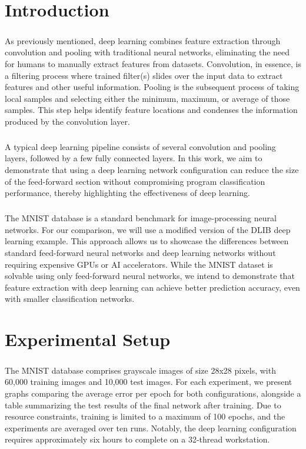 \chapter{Introduction}
\paragraph{}As previously mentioned, deep learning combines feature extraction through convolution and pooling with traditional neural networks, eliminating the need for humans to manually extract features from datasets. Convolution, in essence, is a filtering process where trained filter(s) slides over the input data to extract features and other useful information. Pooling is the subsequent process of taking local samples and selecting either the minimum, maximum, or average of those samples. This step helps identify feature locations and condenses the information produced by the convolution layer.

\paragraph{}A typical deep learning pipeline consists of several convolution and pooling layers, followed by a few fully connected layers. In this work, we aim to demonstrate that using a deep learning network configuration can reduce the size of the feed-forward section without compromising program classification performance, thereby highlighting the effectiveness of deep learning.

\paragraph{}The MNIST database is a standard benchmark for image-processing neural networks. For our comparison, we will use a modified version of the DLIB deep learning example. This approach allows us to showcase the differences between standard feed-forward neural networks and deep learning networks without requiring expensive GPUs or AI accelerators. While the MNIST dataset is solvable using only feed-forward neural networks, we intend to demonstrate that feature extraction with deep learning can achieve better prediction accuracy, even with smaller classification networks.

\chapter{Experimental Setup}
\paragraph{}
The MNIST database comprises grayscale images of size 28x28 pixels, with 60,000 training images and 10,000 test images. For each experiment, we present graphs comparing the average error per epoch for both configurations, alongside a table summarizing the test results of the final network after training. Due to resource constraints, training is limited to a maximum of 100 epochs, and the experiments are averaged over ten runs. Notably, the deep learning configuration requires approximately six hours to complete on a 32-thread workstation.

